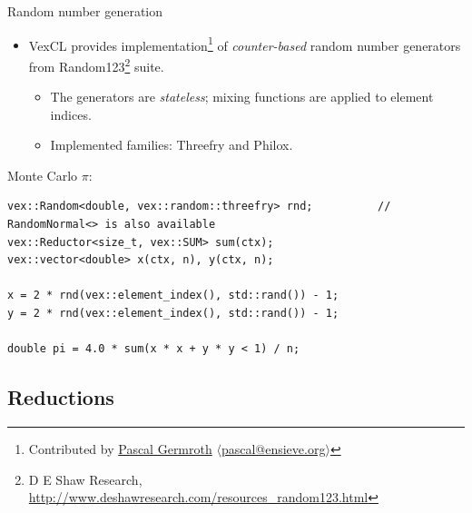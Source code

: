 \documentclass[@BEAMER_OPTIONS@]{beamer}
\begin{document}
\begin{frame}[fragile]{Random number generation}
    \begin{itemize}
        \item VexCL provides implementation\footnote{Contributed by
            \href{https://github.com/neapel}{Pascal Germroth}
            $\langle$\href{mailto:pascal@ensieve.org}{pascal@ensieve.org}$\rangle$}
            of \emph{counter-based} random number generators from
            Random123\footnote{D E Shaw Research,
                \href{http://www.deshawresearch.com/resources\_random123.html}{http://www.deshawresearch.com/resources\_random123.html}}
            suite.
            \begin{itemize}
                \item The generators are \emph{stateless}; mixing functions are
                    applied to element indices.
                \item Implemented families: Threefry and Philox.
            \end{itemize}
    \end{itemize}
    \begin{exampleblock}{Monte Carlo $\pi$:}
        \begin{lstlisting}
vex::Random<double, vex::random::threefry> rnd;          // RandomNormal<> is also available
vex::Reductor<size_t, vex::SUM> sum(ctx);
vex::vector<double> x(ctx, n), y(ctx, n);

x = 2 * rnd(vex::element_index(), std::rand()) - 1;
y = 2 * rnd(vex::element_index(), std::rand()) - 1;

double pi = 4.0 * sum(x * x + y * y < 1) / n;
        \end{lstlisting}
    \end{exampleblock}
\end{frame}


\subsection{Reductions}
\end{document}
